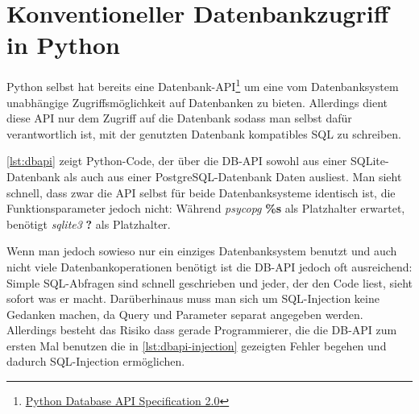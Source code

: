 \section{Konventioneller Datenbankzugriff in Python}

Python selbst hat bereits eine
Datenbank-API\footnote{\href{http://www.python.org/dev/peps/pep-0249/}{Python
Database API Specification 2.0}} um eine vom Datenbanksystem unabhängige
Zugriffsmöglichkeit auf Datenbanken zu bieten.
Allerdings dient diese API nur dem Zugriff auf die Datenbank sodass man selbst
dafür verantwortlich ist, mit der genutzten Datenbank kompatibles SQL zu
schreiben.



\autoref{lst:dbapi} zeigt Python-Code, der über die DB-API sowohl aus
einer SQLite-Datenbank als auch aus einer PostgreSQL-Datenbank Daten ausliest.
Man sieht schnell, dass zwar die API selbst für beide Datenbanksysteme identisch
ist, die Funktionsparameter jedoch nicht: Während \emph{psycopg} \textbf{\%s}
als Platzhalter erwartet, benötigt \emph{sqlite3} \textbf{?} als Platzhalter.

Wenn man jedoch sowieso nur ein einziges Datenbanksystem benutzt und auch nicht
viele Datenbankoperationen benötigt ist die DB-API jedoch oft ausreichend:
Simple SQL-Abfragen sind schnell geschrieben und jeder, der den Code liest,
sieht sofort was er macht. Darüberhinaus muss man sich um SQL-Injection keine
Gedanken machen, da Query und Parameter separat angegeben werden. Allerdings
besteht das Risiko dass gerade Programmierer, die die DB-API zum ersten Mal
benutzen die in \autoref{lst:dbapi-injection} gezeigten Fehler begehen und
dadurch SQL-Injection ermöglichen.


